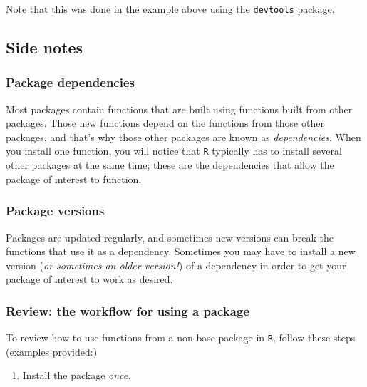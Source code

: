 \documentclass[
]{book}
\providecommand{\tightlist}{%
  \setlength{\itemsep}{0pt}\setlength{\parskip}{0pt}}
\begin{document}
Note that this was done in the example above using the \texttt{devtools} package.

\hypertarget{side-notes}{%
\subsection*{Side notes}\label{side-notes}}

\hypertarget{package-dependencies}{%
\subsubsection*{Package dependencies}\label{package-dependencies}}

Most packages contain functions that are built using functions built from other packages. Those new functions depend on the functions from those other packages, and that's why those other packages are known as \emph{dependencies}. When you install one function, you will notice that \texttt{R} typically has to install several other packages at the same time; these are the dependencies that allow the package of interest to function.

\hypertarget{package-versions}{%
\subsubsection*{Package versions}\label{package-versions}}

Packages are updated regularly, and sometimes new versions can break the functions that use it as a dependency. Sometimes you may have to install a new version (\emph{or sometimes an older version!}) of a dependency in order to get your package of interest to work as desired.

\hypertarget{review-the-workflow-for-using-a-package}{%
\subsubsection*{Review: the workflow for using a package}\label{review-the-workflow-for-using-a-package}}

To review how to use functions from a non-base package in \texttt{R}, follow these steps (examples provided:)

\begin{enumerate}
\def\labelenumi{\arabic{enumi}.}
\tightlist
\item
  Install the package \emph{once.}
\end{enumerate}
\end{document}
